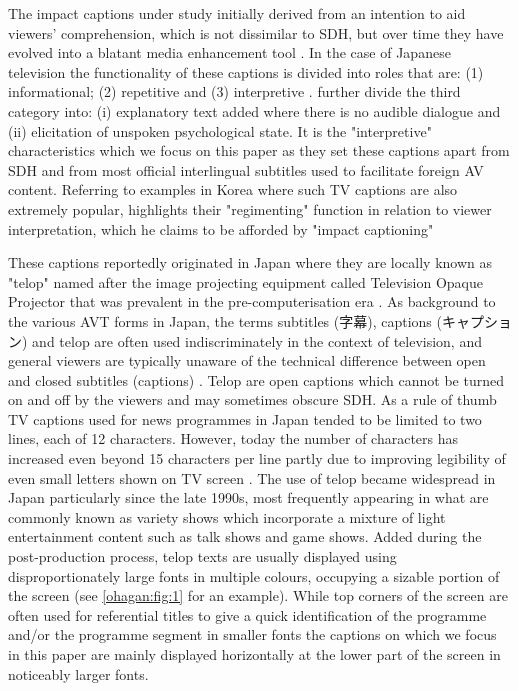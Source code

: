 \documentclass[output=paper]{langsci/langscibook}
\begin{document}
The impact captions under study initially derived from an intention to aid viewers' comprehension, which is not dissimilar to SDH, but over time they have evolved into a blatant media enhancement tool \citep[pp. 48--50]{Kato2012}.  In the case of Japanese television the functionality of these captions is divided into roles that are: (1) informational; (2) repetitive and (3) interpretive \citep[p. 72]{Shiota2003}. \citet{Kimura2000} further divide the third category into: (i) explanatory text added where there is no audible dialogue and (ii) elicitation of unspoken psychological state. It is the "interpretive" characteristics which we focus on this paper as they set these captions apart from SDH and from most official interlingual subtitles used to facilitate foreign AV content. Referring to examples in Korea where such TV captions are also extremely popular, \citet{Park2009} highlights their "regimenting" function in relation to viewer interpretation, which he claims to be afforded by "impact captioning"   

These captions reportedly originated in Japan where they are locally known as "telop" named after the image projecting equipment called Television Opaque Projector that was prevalent in the pre-computerisation era \citep{Sakamoto1999}. As background to the various AVT forms in Japan, the terms subtitles (字幕), captions (キャプション) and telop are often used indiscriminately in the context of television, and general viewers are typically unaware of the technical difference between open and closed subtitles (captions) \citep[pp. 73--74]{ohagan2010}. Telop are open captions which cannot be turned on and off by the viewers and may sometimes obscure SDH.  As a rule of thumb TV captions used for news programmes in Japan tended to be limited to two lines, each of 12 characters. However, today the number of characters has increased even beyond 15 characters per line partly due to improving legibility of even small letters shown on TV screen \citep[pp. 47--48]{Kato2012}. The use of telop became widespread in Japan particularly since the late 1990s, most frequently appearing in what are commonly known as variety shows \citep{Shitara2012} which incorporate a mixture of light entertainment content such as talk shows and game shows. Added during the post-production process, telop texts are usually displayed using disproportionately large fonts in multiple colours, occupying a sizable portion of the screen (see \ref{ohagan:fig:1} for an example).  While top corners of the screen are often used for referential titles to give a quick identification of the programme and/or the programme segment in smaller fonts the captions on which we focus in this paper are mainly displayed horizontally at the lower part of the screen in noticeably larger fonts. 
\end{document}

